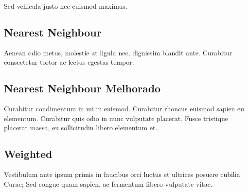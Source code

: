 Sed vehicula justo nec euismod maximus.

\subsection{Nearest Neighbour}

Aenean odio metus, molestie at ligula nec, dignissim blandit ante. Curabitur
consectetur tortor ac lectus egestas tempor.

\subsection{Nearest Neighbour Melhorado}

Curabitur condimentum in mi in euismod. Curabitur rhoncus euismod sapien eu elementum. Curabitur quis odio in nunc vulputate placerat. Fusce tristique placerat massa, eu sollicitudin libero elementum et.

\subsection{Weighted}

Vestibulum ante ipsum primis in faucibus orci luctus et ultrices posuere cubilia Curae; Sed congue quam sapien, ac fermentum libero vulputate vitae.